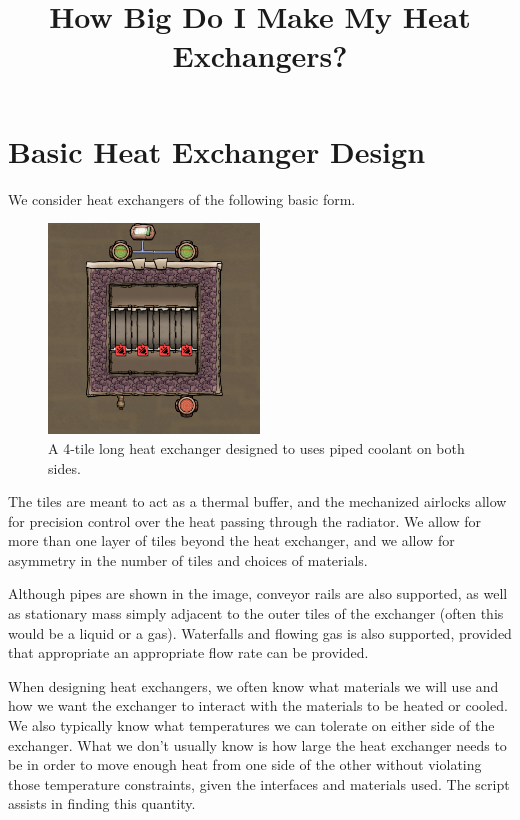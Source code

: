 \documentclass{article}
\title{How Big Do I Make My Heat Exchangers?}
\date{}
\numberwithin{equation}{subsection}
\theoremstyle{remark}
\begin{document}
\maketitle

\section{Basic Heat Exchanger Design}

We consider heat exchangers of the following basic form.

\begin{figure}[H]
\centering
\includegraphics[width=0.5\textwidth]{Basic Passive Heat Exchanger Main Overlay}
\caption{A 4-tile long heat exchanger designed to uses piped coolant on both sides.}
\end{figure}

The tiles are meant to act as a thermal buffer, and the mechanized airlocks allow for precision control over the heat passing through the radiator.
We allow for more than one layer of tiles beyond the heat exchanger, and we allow for asymmetry in the number of tiles and choices of materials.

Although pipes are shown in the image, conveyor rails are also supported, as well as stationary mass simply adjacent to the outer tiles of the exchanger (often this would be a liquid or a gas).
Waterfalls and flowing gas is also supported, provided that appropriate an appropriate flow rate can be provided.

When designing heat exchangers, we often know what materials we will use and how we want the exchanger to interact with the materials to be heated or cooled.
We also typically know what temperatures we can tolerate on either side of the exchanger.
What we don't usually know is how large the heat exchanger needs to be in order to move enough heat from one side of the other without violating those temperature constraints, given the interfaces and materials used.
The script assists in finding this quantity.
\end{document}
